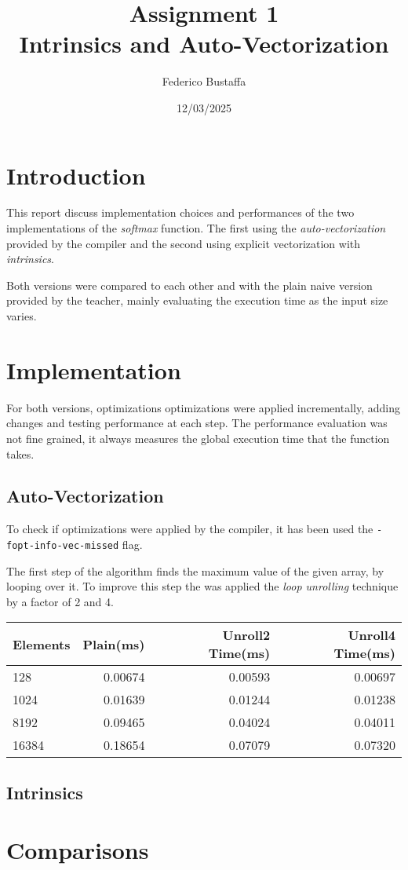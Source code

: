 \documentclass[12pt, a4paper]{article}
\title{Assignment 1\\Intrinsics and Auto-Vectorization}
\author{Federico Bustaffa}
\date{12/03/2025}
\begin{document}
\maketitle
\tableofcontents

\section{Introduction}

This report discuss implementation choices and performances of the two
implementations of the \textit{softmax} function. The first using the
\textit{auto-vectorization} provided by the compiler and the second using
explicit vectorization with \textit{intrinsics}.

Both versions were compared to each other and with the plain naive version
provided by the teacher, mainly evaluating the execution time as the input size
varies.

\section{Implementation}

For both versions, optimizations optimizations were applied incrementally,
adding changes and testing performance at each step. The performance evaluation
was not fine grained, it always measures the global execution time that the
function takes.

\subsection{Auto-Vectorization}

To check if optimizations were applied by the compiler, it has been used the
\verb|-fopt-info-vec-missed| flag.

The first step of the algorithm finds the maximum value of the given array, by
looping over it. To improve this step the was applied the \textit{loop unrolling}
technique by a factor of 2 and 4.

\begin{table}[H]
	\centering
	\begin{tabular}{lrrr}
		\toprule
		Elements & Plain(ms) & Unroll2 Time(ms) & Unroll4 Time(ms) \\
		\midrule
		128      & 0.00674   & 0.00593          & 0.00697          \\
		1024     & 0.01639   & 0.01244          & 0.01238          \\
		8192     & 0.09465   & 0.04024          & 0.04011          \\
		16384    & 0.18654   & 0.07079          & 0.07320          \\
		\bottomrule
	\end{tabular}
\end{table}

\subsection{Intrinsics}

\section{Comparisons}
\end{document}
